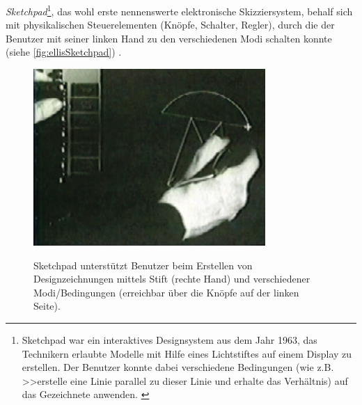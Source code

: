 \medskip \emph{Sketchpad}\footnote{Sketchpad war ein interaktives Designsystem aus dem Jahr 1963, das Technikern erlaubte Modelle mit Hilfe eines Lichtstiftes auf einem Display zu erstellen. Der Benutzer konnte dabei verschiedene Bedingungen (wie z.B. >>erstelle eine Linie parallel zu dieser Linie und erhalte das Verhältnis) auf das Gezeichnete anwenden. \citep{Sutherland:1964}}, das wohl erste nennenswerte elektronische Skizziersystem, behalf sich mit physikalischen Steuerelementen (Knöpfe, Schalter, Regler), durch die der Benutzer mit seiner linken Hand zu den verschiedenen Modi schalten konnte (siehe \autoref{fig:ellisSketchpad}) \citep{Sutherland:1964}. 

\begin{figure}[bth]
	{\includegraphics[width=\linewidth]{gfx/ellisSketchpad}}
	\caption[Sketchpad]{Sketchpad unterstützt Benutzer beim Erstellen von Designzeichnungen mittels Stift (rechte Hand) und verschiedener Modi/Bedingungen (erreichbar über die Knöpfe auf der linken Seite).}
	\label{fig:ellisSketchpad}
\end{figure}


